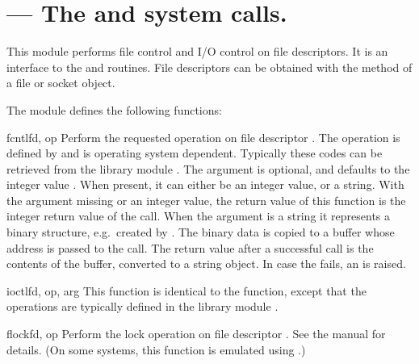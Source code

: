 \section{ ---
         The  and  system calls.}



This module performs file control and I/O control on file descriptors.
It is an interface to the  and 
\UNIX{} routines.  File descriptors can be obtained with the
 method of a file or socket object.

The module defines the following functions:


\begin{funcdesc}{fcntl}{fd, op}
  Perform the requested operation on file descriptor .
  The operation is defined by  and is operating system
  dependent.  Typically these codes can be retrieved from the library
  module . The argument 
  is optional, and defaults to the integer value .  When
  present, it can either be an integer value, or a string.  With
  the argument missing or an integer value, the return value of this
  function is the integer return value of the \C{} 
  call.  When the argument is a string it represents a binary
  structure, e.g.\ created by . The binary
  data is copied to a buffer whose address is passed to the \C{}
   call.  The return value after a successful call
  is the contents of the buffer, converted to a string object.  In
  case the  fails, an  is
  raised.
\end{funcdesc}

\begin{funcdesc}{ioctl}{fd, op, arg}
  This function is identical to the  function, except
  that the operations are typically defined in the library module
  .
\end{funcdesc}

\begin{funcdesc}{flock}{fd, op}
Perform the lock operation  on file descriptor .
See the \UNIX{} manual  for details.  (On some
systems, this function is emulated using .)
\end{funcdesc}

